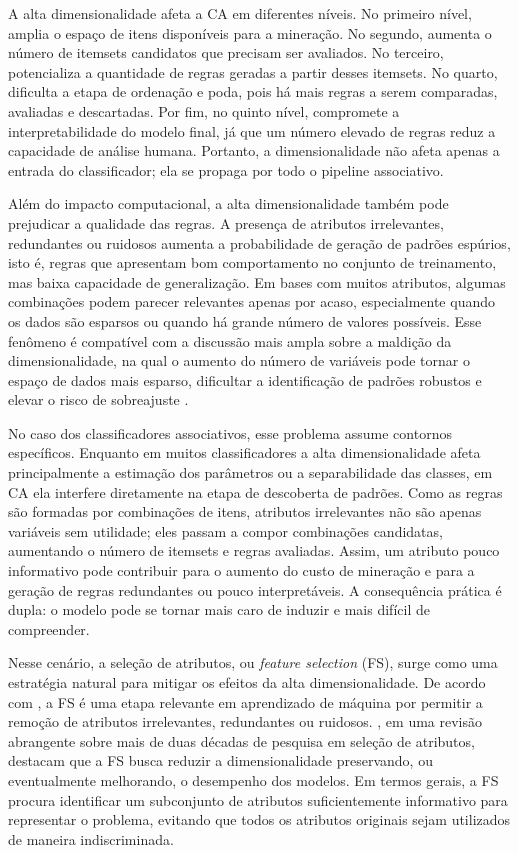 A alta dimensionalidade afeta a CA em diferentes níveis. No primeiro nível, amplia o espaço de itens disponíveis para a mineração. No segundo, aumenta o número de itemsets candidatos que precisam ser avaliados. No terceiro, potencializa a quantidade de regras geradas a partir desses itemsets. No quarto, dificulta a etapa de ordenação e poda, pois há mais regras a serem comparadas, avaliadas e descartadas. Por fim, no quinto nível, compromete a interpretabilidade do modelo final, já que um número elevado de regras reduz a capacidade de análise humana. Portanto, a dimensionalidade não afeta apenas a entrada do classificador; ela se propaga por todo o pipeline associativo.

Além do impacto computacional, a alta dimensionalidade também pode prejudicar a qualidade das regras. A presença de atributos irrelevantes, redundantes ou ruidosos aumenta a probabilidade de geração de padrões espúrios, isto é, regras que apresentam bom comportamento no conjunto de treinamento, mas baixa capacidade de generalização. Em bases com muitos atributos, algumas combinações podem parecer relevantes apenas por acaso, especialmente quando os dados são esparsos ou quando há grande número de valores possíveis. Esse fenômeno é compatível com a discussão mais ampla sobre a maldição da dimensionalidade, na qual o aumento do número de variáveis pode tornar o espaço de dados mais esparso, dificultar a identificação de padrões robustos e elevar o risco de sobreajuste \cite{Dhal2022,Theng2024,BARBIERI2024123667}.

No caso dos classificadores associativos, esse problema assume contornos específicos. Enquanto em muitos classificadores a alta dimensionalidade afeta principalmente a estimação dos parâmetros ou a separabilidade das classes, em CA ela interfere diretamente na etapa de descoberta de padrões. Como as regras são formadas por combinações de itens, atributos irrelevantes não são apenas variáveis sem utilidade; eles passam a compor combinações candidatas, aumentando o número de itemsets e regras avaliadas. Assim, um atributo pouco informativo pode contribuir para o aumento do custo de mineração e para a geração de regras redundantes ou pouco interpretáveis. A consequência prática é dupla: o modelo pode se tornar mais caro de induzir e mais difícil de compreender.

Nesse cenário, a seleção de atributos, ou \textit{feature selection} (FS), surge como uma estratégia natural para mitigar os efeitos da alta dimensionalidade. De acordo com , a FS é uma etapa relevante em aprendizado de máquina por permitir a remoção de atributos irrelevantes, redundantes ou ruidosos. , em uma revisão abrangente sobre mais de duas décadas de pesquisa em seleção de atributos, destacam que a FS busca reduzir a dimensionalidade preservando, ou eventualmente melhorando, o desempenho dos modelos. Em termos gerais, a FS procura identificar um subconjunto de atributos suficientemente informativo para representar o problema, evitando que todos os atributos originais sejam utilizados de maneira indiscriminada.

